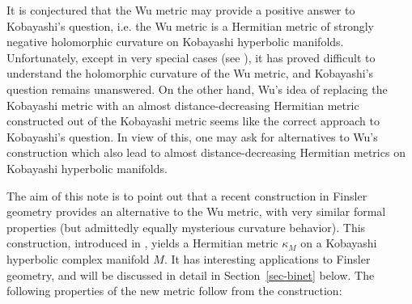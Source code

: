 \documentclass[a4paper,11pt,reqno]{amsart}
\theoremstyle{plain}
\theoremstyle{definition}
\theoremstyle{remark}
\theoremstyle{remark}
\numberwithin{equation}{section}
\begin{document}
It is conjectured that the Wu metric may provide a positive
answer to Kobayashi's question, i.e. the Wu metric is a Hermitian metric 
of strongly negative holomorphic curvature on Kobayashi hyperbolic manifolds.
Unfortunately, except in very special cases (see \cite{cheungkim1,cheunkim2, cheungkimconstant, balaprachiwu1,balaprachiwu2}),  it has proved difficult to understand the holomorphic curvature of the Wu metric, and Kobayashi's question remains 
unanswered. On the other hand, Wu's idea of replacing the Kobayashi metric with an almost distance-decreasing  Hermitian metric
constructed out of the Kobayashi metric seems like the 
correct approach to Kobayashi's question. In view of this, one may
ask for alternatives to Wu's construction which also lead to 
almost distance-decreasing Hermitian metrics on Kobayashi hyperbolic manifolds.

The aim of this note is to point out that a recent construction 
in Finsler geometry provides an alternative to the Wu metric, with very similar formal properties (but admittedly equally mysterious curvature behavior).
This construction, introduced in \cite{binet}, yields a Hermitian metric 
$\kappa_M$ on a Kobayashi hyperbolic complex manifold $ M $. It has interesting applications to Finsler geometry, and will be discussed in detail in Section~\ref{sec-binet} below. The following properties
of the new metric follow from the construction:
\end{document}
